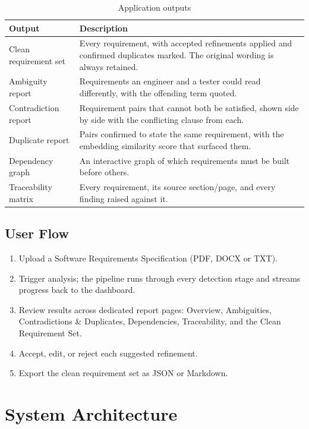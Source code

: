 \documentclass[11pt,a4paper]{article}
\begin{document}
\begin{table}[h!]
\centering
\begin{tabular}{p{3.6cm} p{9.8cm}}
\toprule
\textbf{Output} & \textbf{Description} \\
\midrule
Clean requirement set & Every requirement, with accepted refinements applied
  and confirmed duplicates marked. The original wording is always
  retained. \\
Ambiguity report & Requirements an engineer and a tester could read
  differently, with the offending term quoted. \\
Contradiction report & Requirement pairs that cannot both be satisfied,
  shown side by side with the conflicting clause from each. \\
Duplicate report & Pairs confirmed to state the same requirement, with the
  embedding similarity score that surfaced them. \\
Dependency graph & An interactive graph of which requirements must be
  built before others. \\
Traceability matrix & Every requirement, its source section/page, and every
  finding raised against it. \\
\bottomrule
\end{tabular}
\caption{Application outputs}
\end{table}

\subsection{User Flow}

\begin{enumerate}[leftmargin=1.6em]
  \item Upload a Software Requirements Specification (PDF, DOCX or TXT).
  \item Trigger analysis; the pipeline runs through every detection stage
        and streams progress back to the dashboard.
  \item Review results across dedicated report pages: Overview, Ambiguities,
        Contradictions \& Duplicates, Dependencies, Traceability, and the
        Clean Requirement Set.
  \item Accept, edit, or reject each suggested refinement.
  \item Export the clean requirement set as JSON or Markdown.
\end{enumerate}

\section{System Architecture}
\end{document}
